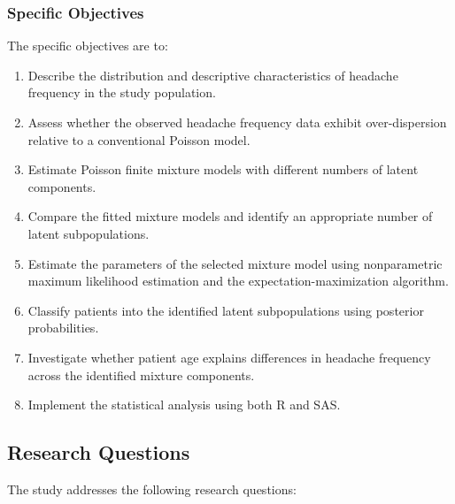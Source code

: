 \subsubsection{Specific Objectives}

The specific objectives are to:

\begin{enumerate}[label=\arabic*.]
    \item Describe the distribution and descriptive characteristics of
    headache frequency in the study population.

    \item Assess whether the observed headache frequency data exhibit
    over-dispersion relative to a conventional Poisson model.

    \item Estimate Poisson finite mixture models with different numbers of
    latent components.

    \item Compare the fitted mixture models and identify an appropriate
    number of latent subpopulations.

    \item Estimate the parameters of the selected mixture model using
    nonparametric maximum likelihood estimation and the
    expectation-maximization algorithm.

    \item Classify patients into the identified latent subpopulations using
    posterior probabilities.

    \item Investigate whether patient age explains differences in headache
    frequency across the identified mixture components.

    \item Implement the statistical analysis using both R and SAS.
\end{enumerate}

\subsection{Research Questions}

The study addresses the following research questions:

